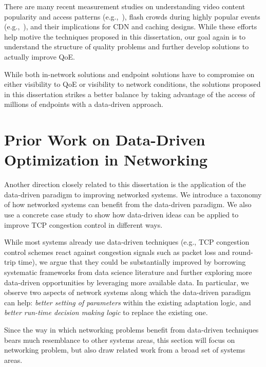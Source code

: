 There are many recent measurement studies on
understanding video content popularity and access patterns
(e.g.,~\cite{youtube-imc07}\cite{plissonneau2012longitudinal}), 
flash crowds during highly popular events (e.g.,~\cite{beijing-imc09}), 
and their implications for CDN and caching designs.  
While these efforts help motive the techniques proposed in 
this dissertation, our goal again is to understand the structure of 
quality problems and further develop solutions to actually improve
QoE.

\vspace{0.5cm}
While both in-network solutions and endpoint solutions have 
to compromise on either visibility to QoE or visibility to network conditions,
the solutions proposed in this dissertation 
strikes a better balance by taking advantage of the access of millions of 
endpoints with a data-driven approach.


\section{Prior Work on Data-Driven Optimization in Networking}
\label{sec:related:data}

Another direction closely related to this 
dissertation is the application of the data-driven paradigm to improving 
networked systems. 
We introduce a taxonomy of how networked systems can benefit from the 
data-driven paradigm.
We also use a concrete case study to show how data-driven ideas can
be applied to improve TCP congestion control in different ways. 

While most systems already use data-driven techniques 
(e.g., TCP congestion control schemes react against congestion 
signals such as packet loss and round-trip time),
we argue that they could be substantially
improved by borrowing systematic frameworks from data science
literature and further exploring more data-driven opportunities by
leveraging more available data.
In particular, we observe two aspects of network systems along 
which the data-driven paradigm can help:
{\em better setting of parameters} within the existing adaptation logic,
and {\em better run-time decision making logic} to replace the existing one.

Since the way in which networking problems benefit from data-driven 
techniques bears much resemblance to 
other systems areas, 
this section will focus on networking problem, but also draw 
related work from a broad set of systems areas.

